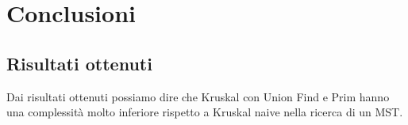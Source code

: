 \chapter{Conclusioni\label{sec:conclusioni}}

\section{Risultati ottenuti\label{sec:risultati-ottenuti}}
Dai risultati ottenuti possiamo dire che Kruskal con Union Find e Prim hanno una complessità molto inferiore rispetto a Kruskal naive nella ricerca di un MST.

